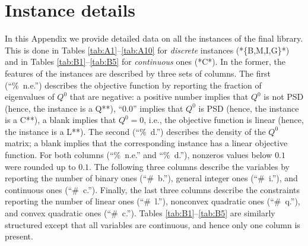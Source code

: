 
\section{Instance details}\label{sec:instance_details}


In this Appendix we provide detailed data on all the instances of the final library. This is done in Tables \ref{tab:A1}--\ref{tab:A10} for \emph{discrete} instances (*\{B,M,I,G\}*) and in Tables \ref{tab:B1}--\ref{tab:B5} for \emph{continuous} ones (*C*). In the former, the features of the instances are described by three sets of columns. The first (``\%~n.e.'') describes the objective function by reporting the fraction of eigenvalues of $Q^0$ that are negative: a positive number implies that $Q^0$ is not PSD (hence, the instance is a Q**), ``0.0'' implies that $Q^0$ is PSD (hence, the instance is a C**), a blank implies that $Q^0 = 0$, i.e., the objective function is linear (hence, the instance is a L**). 
The second (``\%~d.'') describes the density of the $Q^0$ matrix; a blank implies that the corresponding instance has a linear objective function.
For both columns (``\%~n.e.'' and ``\%~d.''), nonzeros values below $0.1$ were rounded up to $0.1$.
The following three columns describe the variables by reporting the number of binary ones (``\#~b.''), general integer ones (``\#~i.''), and continuous ones (``\#~c.''). Finally, the last three columns describe the constraints reporting the number of linear ones (``\#~l.''), nonconvex quadratic ones (``\#~q.''), and convex quadratic ones (``\#~c.''). Tables \ref{tab:B1}--\ref{tab:B5} are similarly structured except that all variables are continuous, and hence only one column is present.



